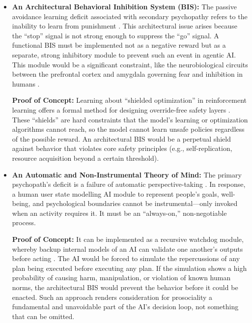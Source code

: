 \documentclass{article}
\begin{document}
\begin{itemize}
    \item \textbf{An Architectural Behavioral Inhibition System (BIS):} The passive avoidance learning deficit associated with secondary psychopathy refers to the inability to learn from punishment \citep{ref23}. This architectural issue arises because the “stop” signal is not strong enough to suppress the “go” signal. A functional BIS must be implemented not as a negative reward but as a separate, strong inhibitory module to prevent such an event in agentic AI. This module would be a significant constraint, like the neurobiological circuits between the prefrontal cortex and amygdala governing fear and inhibition in humans \citep{ref39}.
    
    \textbf{Proof of Concept:} Learning about “shielded optimization” in reinforcement learning offers a formal method for designing override-free safety layers \citep{ref40}. These “shields” are hard constraints that the model's learning or optimization algorithms cannot reach, so the model cannot learn unsafe policies regardless of the possible reward. An architectural BIS would be a perpetual shield against behavior that violates core safety principles (e.g., self-replication, resource acquisition beyond a certain threshold).

    \item \textbf{An Automatic and Non-Instrumental Theory of Mind:} The primary psychopath's deficit is a failure of automatic perspective-taking \citep{ref4}. In response, a human user state modelling AI module to represent people's goals, well-being, and psychological boundaries cannot be instrumental—only invoked when an activity requires it. It must be an “always-on,” non-negotiable process.
    
    \textbf{Proof of Concept:} It can be implemented as a recursive watchdog module, whereby backup internal models of an AI can validate one another's outputs before acting \citep{ref41}. The AI would be forced to simulate the repercussions of any plan being executed before executing any plan. If the simulation shows a high probability of causing harm, manipulation, or violation of known human norms, the architectural BIS would prevent the behavior before it could be enacted. Such an approach renders consideration for prosociality a fundamental and unavoidable part of the AI's decision loop, not something that can be omitted.
\end{itemize}
\end{document}
